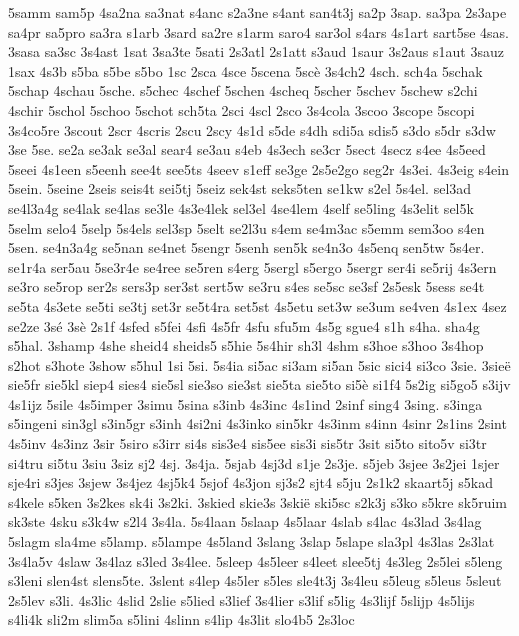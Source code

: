 {5samm
sam5p
4sa2na
sa3nat
s4anc
s2a3ne
s4ant
san4t3j
sa2p
3sap.
sa3pa
2s3ape
sa4pr
sa5pro
sa3ra
s1arb
3sard
sa2re
s1arm
saro4
sar3ol
s4ars
4s1art
sart5se
4sas.
3sasa
sa3sc
3s4ast
1sat
3sa3te
5sati
2s3atl
2s1att
s3aud
1saur
3s2aus
s1aut
3sauz
1sax
4s3b
s5ba
s5be
s5bo
1sc
2sca
4sce
5scena
5scè
3s4ch2
4sch.
sch4a
5schak
5schap
4schau
5sche.
s5chec
4schef
5schen
4scheq
5scher
5schev
5schew
s2chi
4schir
5schol
5schoo
5schot
sch5ta
2sci
4scl
2sco
3s4cola
3scoo
3scope
5scopi
3s4co5re
3scout
2scr
4scris
2scu
2scy
4s1d
s5de
s4dh
sdi5a
sdis5
s3do
s5dr
s3dw
3se
5se.
se2a
se3ak
se3al
sear4
se3au
s4eb
4s3ech
se3cr
5sect
4secz
s4ee
4s5eed
5seei
4s1een
s5eenh
see4t
see5ts
4seev
s1eff
se3ge
2s5e2go
seg2r
4s3ei.
4s3eig
s4ein
5sein.
5seine
2seis
seis4t
sei5tj
5seiz
sek4st
seks5ten
se1kw
s2el
5s4el.
sel3ad
se4l3a4g
se4lak
se4las
se3le
4s3e4lek
sel3el
4se4lem
4self
se5ling
4s3elit
sel5k
5selm
selo4
5selp
5s4els
sel3sp
5selt
se2l3u
s4em
se4m3ac
s5emm
sem3oo
s4en
5sen.
se4n3a4g
se5nan
se4net
5sengr
5senh
sen5k
se4n3o
4s5enq
sen5tw
5s4er.
se1r4a
ser5au
5se3r4e
se4ree
se5ren
s4erg
5sergl
s5ergo
5sergr
ser4i
se5rij
4s3ern
se3ro
se5rop
ser2s
sers3p
ser3st
sert5w
se3ru
s4es
se5sc
se3sf
2s5esk
5sess
se4t
se5ta
4s3ete
se5ti
se3tj
set3r
se5t4ra
set5st
4s5etu
set3w
se3um
se4ven
4s1ex
4sez
se2ze
3sé
3sè
2s1f
4sfed
s5fei
4sfi
4s5fr
4sfu
sfu5m
4s5g
sgue4
s1h
s4ha.
sha4g
s5hal.
3shamp
4she
sheid4
sheids5
s5hie
5s4hir
sh3l
4shm
s3hoe
s3hoo
3s4hop
s2hot
s3hote
3show
s5hul
1si
5si.
5s4ia
si5ac
si3am
si5an
5sic
sici4
si3co
3sie.
3sieë
sie5fr
sie5kl
siep4
sies4
sie5sl
sie3so
sie3st
sie5ta
sie5to
si5è
si1f4
5s2ig
si5go5
s3ijv
4s1ijz
5sile
4s5imper
3simu
5sina
s3inb
4s3inc
4s1ind
2sinf
sing4
3sing.
s3inga
s5ingeni
sin3gl
s3in5gr
s3inh
4si2ni
4s3inko
sin5kr
4s3inm
s4inn
4sinr
2s1ins
2sint
4s5inv
4s3inz
3sir
5siro
s3irr
si4s
sis3e4
sis5ee
sis3i
sis5tr
3sit
si5to
sito5v
si3tr
si4tru
si5tu
3siu
3siz
sj2
4sj.
3s4ja.
5sjab
4sj3d
s1je
2s3je.
s5jeb
3sjee
3s2jei
1sjer
sje4ri
s3jes
3sjew
3s4jez
4sj5k4
5sjof
4s3jon
sj3s2
sjt4
s5ju
2s1k2
skaart5j
s5kad
s4kele
s5ken
3s2kes
sk4i
3s2ki.
3skied
skie3s
3skië
ski5sc
s2k3j
s3ko
s5kre
sk5ruim
sk3ste
4sku
s3k4w
s2l4
3s4la.
5s4laan
5slaap
4s5laar
4slab
s4lac
4s3lad
3s4lag
5slagm
sla4me
s5lamp.
s5lampe
4s5land
3slang
3slap
5slape
sla3pl
4s3las
2s3lat
3s4la5v
4slaw
3s4laz
s3led
3s4lee.
5sleep
4s5leer
s4leet
slee5tj
4s3leg
2s5lei
s5leng
s3leni
slen4st
slens5te.
3slent
s4lep
4s5ler
s5les
sle4t3j
3s4leu
s5leug
s5leus
5sleut
2s5lev
s3li.
4s3lic
4slid
2slie
s5lied
s3lief
3s4lier
s3lif
s5lig
4s3lijf
5slijp
4s5lijs
s4li4k
sli2m
slim5a
s5lini
4slinn
s4lip
4s3lit
slo4b5
2s3loc
}
